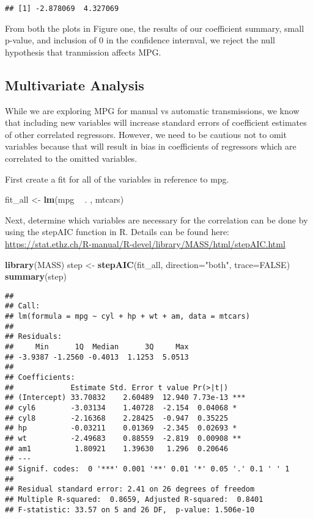 \documentclass[]{article}
\newenvironment{Shaded}{\begin{snugshade}}{\end{snugshade}}
\newcommand{\KeywordTok}[1]{\textcolor[rgb]{0.13,0.29,0.53}{\textbf{#1}}}
\newcommand{\DataTypeTok}[1]{\textcolor[rgb]{0.13,0.29,0.53}{#1}}
\newcommand{\StringTok}[1]{\textcolor[rgb]{0.31,0.60,0.02}{#1}}
\newcommand{\OtherTok}[1]{\textcolor[rgb]{0.56,0.35,0.01}{#1}}
\newcommand{\OperatorTok}[1]{\textcolor[rgb]{0.81,0.36,0.00}{\textbf{#1}}}
\newcommand{\NormalTok}[1]{#1}
\begin{document}
\begin{verbatim}
## [1] -2.878069  4.327069
\end{verbatim}

From both the plots in Figure one, the results of our coefficient
summary, small p-value, and inclusion of 0 in the confidence internval,
we reject the null hypothesis that tranmission affects MPG.

\subsection{Multivariate Analysis}\label{multivariate-analysis}

While we are exploring MPG for manual vs automatic transmissions, we
know that including new variables will increase standard errors of
coefficient estimates of other correlated regressors. However, we need
to be cautious not to omit variables because that will result in bias in
coefficients of regressors which are correlated to the omitted
variables.

First create a fit for all of the variables in reference to mpg.

\begin{Shaded}
\begin{Highlighting}[]
\NormalTok{fit_all <-}\StringTok{ }\KeywordTok{lm}\NormalTok{(mpg }\OperatorTok{~}\StringTok{ }\NormalTok{. , mtcars)}
\end{Highlighting}
\end{Shaded}

Next, determine which variables are necessary for the correlation can be
done by using the stepAIC function in R. Details can be found here:
\url{https://stat.ethz.ch/R-manual/R-devel/library/MASS/html/stepAIC.html}

\begin{Shaded}
\begin{Highlighting}[]
\KeywordTok{library}\NormalTok{(MASS)}
\NormalTok{step <-}\StringTok{ }\KeywordTok{stepAIC}\NormalTok{(fit_all, }\DataTypeTok{direction=}\StringTok{"both"}\NormalTok{, }\DataTypeTok{trace=}\OtherTok{FALSE}\NormalTok{)}
\KeywordTok{summary}\NormalTok{(step)}
\end{Highlighting}
\end{Shaded}

\begin{verbatim}
## 
## Call:
## lm(formula = mpg ~ cyl + hp + wt + am, data = mtcars)
## 
## Residuals:
##     Min      1Q  Median      3Q     Max 
## -3.9387 -1.2560 -0.4013  1.1253  5.0513 
## 
## Coefficients:
##             Estimate Std. Error t value Pr(>|t|)    
## (Intercept) 33.70832    2.60489  12.940 7.73e-13 ***
## cyl6        -3.03134    1.40728  -2.154  0.04068 *  
## cyl8        -2.16368    2.28425  -0.947  0.35225    
## hp          -0.03211    0.01369  -2.345  0.02693 *  
## wt          -2.49683    0.88559  -2.819  0.00908 ** 
## am1          1.80921    1.39630   1.296  0.20646    
## ---
## Signif. codes:  0 '***' 0.001 '**' 0.01 '*' 0.05 '.' 0.1 ' ' 1
## 
## Residual standard error: 2.41 on 26 degrees of freedom
## Multiple R-squared:  0.8659, Adjusted R-squared:  0.8401 
## F-statistic: 33.57 on 5 and 26 DF,  p-value: 1.506e-10
\end{verbatim}
\end{document}

